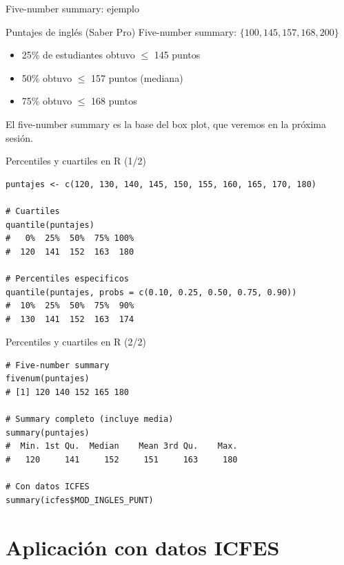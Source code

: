 \documentclass[aspectratio=169, 11pt]{beamer}
\begin{document}
\begin{frame}{Five-number summary: ejemplo}
\begin{exampleblock}{Puntajes de inglés (Saber Pro)}
Five-number summary: $\{100, 145, 157, 168, 200\}$
\begin{itemize}
\item 25\% de estudiantes obtuvo $\leq$ 145 puntos
\item 50\% obtuvo $\leq$ 157 puntos (mediana)
\item 75\% obtuvo $\leq$ 168 puntos
\end{itemize}
\end{exampleblock}

\vspace{1em}
\alert{El five-number summary es la base del box plot}, que veremos en la próxima sesión.
\end{frame}

\begin{frame}[fragile]{Percentiles y cuartiles en R (1/2)}
\begin{lstlisting}
puntajes <- c(120, 130, 140, 145, 150, 155, 160, 165, 170, 180)

# Cuartiles
quantile(puntajes)
#   0%  25%  50%  75% 100%
#  120  141  152  163  180

# Percentiles especificos
quantile(puntajes, probs = c(0.10, 0.25, 0.50, 0.75, 0.90))
#  10%  25%  50%  75%  90%
#  130  141  152  163  174
\end{lstlisting}
\end{frame}

\begin{frame}[fragile]{Percentiles y cuartiles en R (2/2)}
\begin{lstlisting}
# Five-number summary
fivenum(puntajes)
# [1] 120 140 152 165 180

# Summary completo (incluye media)
summary(puntajes)
#  Min. 1st Qu.  Median    Mean 3rd Qu.    Max.
#   120     141     152     151     163     180

# Con datos ICFES
summary(icfes$MOD_INGLES_PUNT)
\end{lstlisting}
\end{frame}

\section{Aplicación con datos ICFES}
\end{document}
